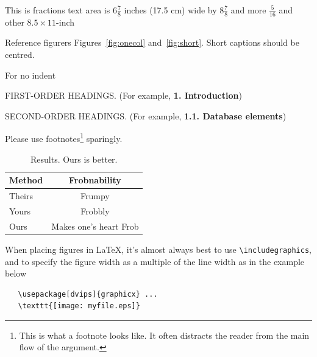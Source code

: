 \documentclass[10pt,twocolumn,letterpaper]{article}
\begin{document}
This is fractions text area is $6\frac78$ inches (17.5 cm) wide by $8\frac78$
and more $\frac{5}{16}$ and other $8.5 \times 11$-inch

Reference figurers Figures~\ref{fig:onecol} and~\ref{fig:short}.  Short captions should be centred.

\noindent For no indent

FIRST-ORDER HEADINGS. (For example, {\large \bf 1. Introduction})

SECOND-ORDER HEADINGS. (For example, { \bf 1.1. Database elements})

Please use footnotes\footnote {This is what a footnote looks like.  It
often distracts the reader from the main flow of the argument.} sparingly.

\begin{table}
  \begin{center}
    \begin{tabular}{|l|c|}
      \hline
      Method & Frobnability \\
      \hline\hline
      Theirs & Frumpy \\
      Yours & Frobbly \\
      Ours & Makes one's heart Frob\\
      \hline
    \end{tabular}
  \end{center}
  \caption{Results.   Ours is better.}
\end{table}

When placing figures in \LaTeX, it's almost always best to use
\verb+\includegraphics+, and to specify the  figure width as a multiple of
the line width as in the example below
{\small\begin{verbatim}
   \usepackage[dvips]{graphicx} ...
   \texttt{[image: myfile.eps]}
\end{verbatim}
}


{\small


}
\end{document}

